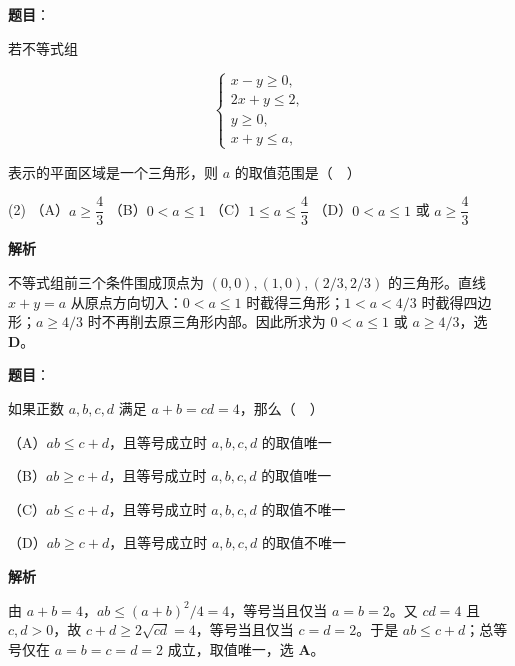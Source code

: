 \begin{answer}

\textbf{题目}：

若不等式组

\nopagebreak[4]
\[
\begin{cases}
x-y\geq 0,\\
2x+y\leq 2,\\
y\geq 0,\\
x+y\leq a,
\end{cases}
\]

表示的平面区域是一个三角形，则 $a$ 的取值范围是（　）

\begin{gkopts}(2)
\task （A）$a\geq\dfrac43$
\task （B）$0<a\leq 1$
\task （C）$1\leq a\leq\dfrac43$
\task （D）$0<a\leq 1$ 或 $a\geq\dfrac43$
\end{gkopts}

\textbf{解析}

不等式组前三个条件围成顶点为 $(0,0),(1,0),(2/3,2/3)$ 的三角形。直线 $x+y=a$ 从原点方向切入：$0<a\le1$ 时截得三角形；$1<a<4/3$ 时截得四边形；$a\ge4/3$ 时不再削去原三角形内部。因此所求为 $0<a\le1$ 或 $a\ge4/3$，选 \textbf{D}。


\end{answer}
\begin{answer}

\textbf{题目}：

如果正数 $a,b,c,d$ 满足 $a+b=cd=4$，那么（　）

（A）$ab\leq c+d$，且等号成立时 $a,b,c,d$ 的取值唯一

（B）$ab\geq c+d$，且等号成立时 $a,b,c,d$ 的取值唯一

（C）$ab\leq c+d$，且等号成立时 $a,b,c,d$ 的取值不唯一

（D）$ab\geq c+d$，且等号成立时 $a,b,c,d$ 的取值不唯一

\textbf{解析}

由 $a+b=4$，$ab\le(a+b)^2/4=4$，等号当且仅当 $a=b=2$。又 $cd=4$ 且 $c,d>0$，故 $c+d\ge2\sqrt{cd}=4$，等号当且仅当 $c=d=2$。于是 $ab\le c+d$；总等号仅在 $a=b=c=d=2$ 成立，取值唯一，选 \textbf{A}。


\end{answer}
